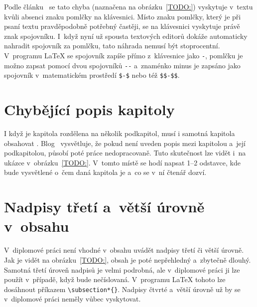 Podle článku~\cite{Zaklady_typografie:Slezakova} se tato chyba (naznačena na
obrázku~\ref{TODO:}) vyskytuje v~textu kvůli absenci znaku pomlčky na klávesnici.
Místo znaku pomlčky, který je při psaní textu pravděpodobně potřebný častěji,
se na klávesnici vyskytuje právě znak spojovníku. I~když nyní už spousta
textových editorů dokáže automaticky nahradit spojovník za pomlčku, tato náhrada
nemusí být stoprocentní. V~programu {\LaTeX} se spojovník zapíše přímo
z~klávesnice jako \verb|-|,
pomlčku je možno zapsat pomocí dvou spojovníků \verb|--| a~znaménko minus je
zapsáno jako spojovník v~matematickém prostředí \verb|$-$| nebo též \verb|$$-$$|.



\section{Chybějící popis kapitoly}

I když je kapitola rozdělena na několik podkapitol, musí i samotná kapitola
obsahovat . Blog~\cite{Leany_blog} vysvětluje, že pokud není uveden
popis mezi kapitolou a~její podkapitolou, působí poté práce nedopracovaně. Tuto
skutečnost lze vidět i~na ukázce v~obrázku~\ref{TODO:}. V~tomto místě
se hodí napsat 1--2 odstavce, kde bude vysvětlené o~čem daná kapitola je a~co se
v~ní čtenář dozví.


\section{Nadpisy třetí a~větší úrovně v~obsahu}
V~diplomové práci není vhodné v~obsahu uvádět nadpisy třetí či větší úrovně.
Jak je vidět na obrázku~\ref{TODO:}, obsah je poté nepřehledný a~zbytečně
dlouhý. Samotná třetí úroveň nadpisů je velmi podrobná, ale v~diplomové práci
ji lze použít v~případě, když bude nečíslovaná. V~programu {\LaTeX} tohoto lze dosáhnout
příkazem \verb|\subsection*{}|. Nadpisy čtvrté a~větší úrovně už by se v~diplomové
práci neměly vůbec vyskytovat.



